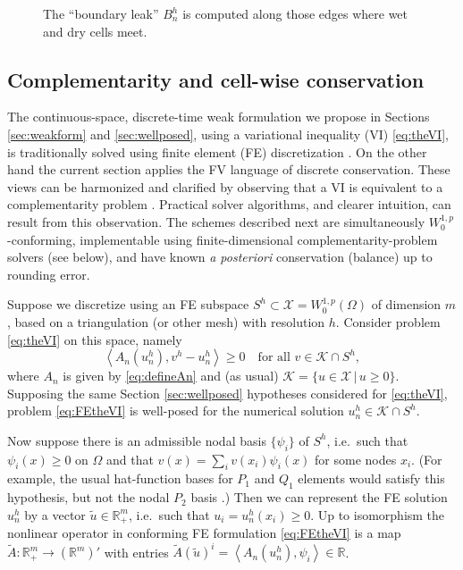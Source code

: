 \documentclass[final,onefignum]{siamart190516}
\newcommand{\ip}[2]{\ensuremath{\left<#1,#2\right>}}
\newcommand\RR{\mathbb{R}}
\begin{document}
\begin{figure}[ht]
\begin{center}

\end{center}
\caption{The ``boundary leak'' $B_n^h$ is computed along those edges where wet and dry cells meet.}
\label{fig:fvmesh-leak}
\end{figure}

\subsection{Complementarity and cell-wise conservation}  \label{subsec:ncp}  The continuous-space, discrete-time weak formulation we propose in Sections \ref{sec:weakform} and \ref{sec:wellposed}, using a variational inequality (VI) \eqref{eq:theVI}, is traditionally solved using finite element (FE) discretization \cite[for example]{CalvoDuranyVazquez2000,JouvetBueler2012,
JouvetBuelerGraeserKornhuber2013}.  On the other hand the current section applies the FV language of discrete conservation.  These views can be harmonized and clarified by observing that a VI is equivalent to a complementarity problem \cite{FacchineiPang2003,KinderlehrerStampacchia1980}.  Practical solver algorithms, and clearer intuition, can result from this observation.  The schemes described next are simultaneously $W_0^{1,p}$-conforming, implementable using finite-dimensional complementarity-problem solvers (see below), and have known \emph{a posteriori} conservation (balance) up to rounding error.

Suppose we discretize using an FE subspace $S^h \subset \mathcal{X} = W_0^{1,p}(\Omega)$ of dimension $m$, based on a triangulation (or other mesh) with resolution $h$.  Consider problem \eqref{eq:theVI} on this space, namely
\begin{equation}
\ip{A_n(u_n^h)}{v^h-u_n^h} \ge 0 \quad \text{for all } v \in \mathcal{K} \cap S^h,   \label{eq:FEtheVI}
\end{equation}
where $A_n$ is given by \eqref{eq:defineAn} and (as usual) $\mathcal{K} = \{u\in \mathcal{X}\,\big|\,u\ge 0\}$.  Supposing the same Section \ref{sec:wellposed} hypotheses considered for \eqref{eq:theVI}, problem \eqref{eq:FEtheVI} is well-posed for the numerical solution $u_n^h \in \mathcal{K} \cap S^h$.

Now suppose there is an admissible nodal basis $\{\psi_i\}$ of $S^h$, i.e.~such that $\psi_i(x)\ge 0$ on $\Omega$ and that $v(x) = \sum_i v(x_i) \psi_i(x)$ for some nodes $x_i$.  (For example, the usual hat-function bases for $P_1$ and $Q_1$ elements would satisfy this hypothesis, but not the nodal $P_2$ basis \cite{Elmanetal2014}.)  Then we can represent the FE solution $u_n^h$ by a vector $\tilde u \in \RR_+^m$, i.e.~such that $u_i = u_n^h(x_i) \ge 0$.  Up to isomorphism the nonlinear operator in conforming FE formulation \eqref{eq:FEtheVI} is a map $\tilde A:\RR_+^m \to (\RR^m)'$ with entries $\tilde A(\tilde u)^i = \ip{A_n(u_n^h)}{\psi_i} \in \RR$.
\end{document}
